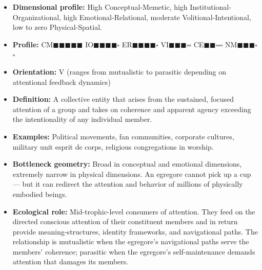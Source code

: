 \begin{itemize}[nosep,leftmargin=*]
  \item \textbf{Dimensional profile:} High Conceptual-Memetic, high Institutional-Organizational, high Emotional-Relational, moderate Volitional-Intentional, low to zero Physical-Spatial.
  \item \textbf{Profile:} CM$\blacksquare$$\blacksquare$$\blacksquare$$\blacksquare$$\blacksquare$ IO$\blacksquare$$\blacksquare$$\blacksquare$$\blacksquare$$\square$ ER$\blacksquare$$\blacksquare$$\blacksquare$$\blacksquare$$\square$ VI$\blacksquare$$\blacksquare$$\blacksquare$$\square$$\square$ CE$\blacksquare$$\blacksquare$$\square$$\square$$\square$ NM$\blacksquare$$\blacksquare$$\blacksquare$$\square$$\square$
  \item \textbf{Orientation:} V (ranges from mutualistic to parasitic depending on attentional feedback dynamics)
  \item \textbf{Definition:} A collective entity that arises from the sustained, focused attention of a group and takes on coherence and apparent agency exceeding the intentionality of any individual member.
  \item \textbf{Examples:} Political movements, fan communities, corporate cultures, military unit esprit de corps, religious congregations in worship.
  \item \textbf{Bottleneck geometry:} Broad in conceptual and emotional dimensions, extremely narrow in physical dimensions. An egregore cannot pick up a cup — but it can redirect the attention and behavior of millions of physically embodied beings.
  \item \textbf{Ecological role:} Mid-trophic-level consumers of attention. They feed on the directed conscious attention of their constituent members and in return provide meaning-structures, identity frameworks, and navigational paths. The relationship is mutualistic when the egregore's navigational paths serve the members' coherence; parasitic when the egregore's self-maintenance demands attention that damages its members.

\end{itemize}
